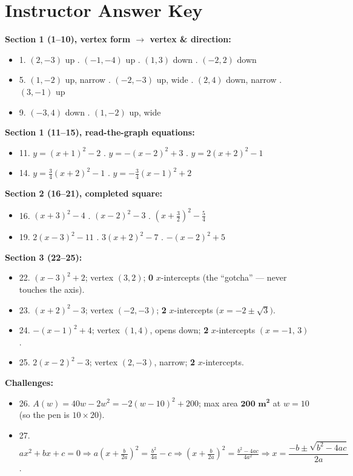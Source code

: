 \documentclass[12pt]{article}
\begin{document}
\section*{Instructor Answer Key}
\textbf{Section 1 (1--10), vertex form $\to$ vertex \& direction:}
\begin{itemize}\itemsep2pt
  \item 1. $(2,-3)$ up . $(-1,-4)$ up . $(1,3)$ down . $(-2,2)$ down
  \item 5. $(1,-2)$ up, narrow . $(-2,-3)$ up, wide . $(2,4)$ down, narrow . $(3,-1)$ up
  \item 9. $(-3,4)$ down . $(1,-2)$ up, wide
\end{itemize}
\textbf{Section 1 (11--15), read-the-graph equations:}
\begin{itemize}\itemsep2pt
  \item 11. $y=(x+1)^2-2$ . $y=-(x-2)^2+3$ . $y=2(x+2)^2-1$
  \item 14. $y=\tfrac{3}{4}(x+2)^2-1$ . $y=-\tfrac{3}{4}(x-1)^2+2$
\end{itemize}
\textbf{Section 2 (16--21), completed square:}
\begin{itemize}\itemsep2pt
  \item 16. $(x+3)^2-4$ . $(x-2)^2-3$ . $\left(x+\tfrac{3}{2}\right)^2-\tfrac{5}{4}$
  \item 19. $2(x-3)^2-11$ . $3(x+2)^2-7$ . $-(x-2)^2+5$
\end{itemize}
\textbf{Section 3 (22--25):}
\begin{itemize}\itemsep2pt
  \item 22. $(x-3)^2+2$; vertex $(3,2)$; \textbf{0} $x$-intercepts (the ``gotcha'' --- never touches the axis).
  \item 23. $(x+2)^2-3$; vertex $(-2,-3)$; \textbf{2} $x$-intercepts $\big(x=-2\pm\sqrt3\big)$.
  \item 24. $-(x-1)^2+4$; vertex $(1,4)$, opens down; \textbf{2} $x$-intercepts $(x=-1,\,3)$.
  \item 25. $2(x-2)^2-3$; vertex $(2,-3)$, narrow; \textbf{2} $x$-intercepts.
\end{itemize}
\textbf{Challenges:}
\begin{itemize}\itemsep2pt
  \item 26. $A(w)=40w-2w^2=-2(w-10)^2+200$; max area $\mathbf{200\text{ m}^2}$ at $w=10$ (so the pen is $10\times 20$).
  \item 27. $ax^2+bx+c=0 \Rightarrow a\!\left(x+\tfrac{b}{2a}\right)^2 = \tfrac{b^2}{4a}-c \Rightarrow
        \left(x+\tfrac{b}{2a}\right)^2=\tfrac{b^2-4ac}{4a^2} \Rightarrow x=\dfrac{-b\pm\sqrt{b^2-4ac}}{2a}$.
\end{itemize}
\end{document}
